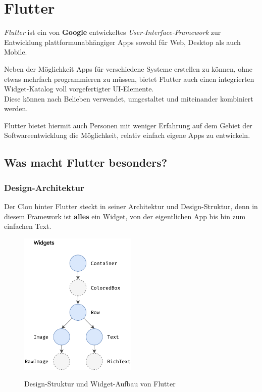\section{Flutter}

\textit{Flutter} ist ein von \textbf{Google} entwickeltes \textit{User-Interface-Framework} zur
Entwicklung plattformunabhängiger Apps sowohl für Web, Desktop als auch Mobile.\cite{flutteroverview2021}

Neben der Möglichkeit Apps für verschiedene Systeme erstellen zu können, ohne etwas mehrfach programmieren
zu müssen, bietet Flutter auch einen integrierten Widget-Katalog voll vorgefertigter UI-Elemente.\\
Diese können nach Belieben verwendet, umgestaltet und miteinander kombiniert werden.

Flutter bietet hiermit auch Personen mit weniger Erfahrung auf dem Gebiet der Softwareentwicklung
die Möglichkeit, relativ einfach eigene Apps zu entwickeln.

\subsection{Was macht Flutter besonders?}

\subsubsection{Design-Architektur}

Der Clou hinter Flutter steckt in seiner Architektur und Design-Struktur, denn in diesem Framework ist \textbf{alles} ein Widget,
von der eigentlichen App bis hin zum einfachen Text.

\begin{figure}[H]
    \begin{center}
        \includegraphics[width=0.5\textwidth]{images/Flutter/design-structure.png}
        \caption{Design-Struktur und Widget-Aufbau von Flutter}
        \cite{flutterDesignArchitecture}
    \end{center}
\end{figure}

